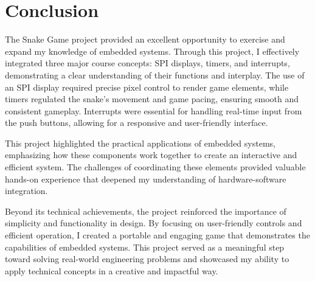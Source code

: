 \section{Conclusion}

The Snake Game project provided an excellent opportunity to exercise and expand my knowledge of embedded systems. Through this project, I effectively integrated three major course concepts: SPI displays, timers, and interrupts, demonstrating a clear understanding of their functions and interplay. The use of an SPI display required precise pixel control to render game elements, while timers regulated the snake’s movement and game pacing, ensuring smooth and consistent gameplay. Interrupts were essential for handling real-time input from the push buttons, allowing for a responsive and user-friendly interface.

This project highlighted the practical applications of embedded systems, emphasizing how these components work together to create an interactive and efficient system. The challenges of coordinating these elements provided valuable hands-on experience that deepened my understanding of hardware-software integration.

Beyond its technical achievements, the project reinforced the importance of simplicity and functionality in design. By focusing on user-friendly controls and efficient operation, I created a portable and engaging game that demonstrates the capabilities of embedded systems. This project served as a meaningful step toward solving real-world engineering problems and showcased my ability to apply technical concepts in a creative and impactful way.
 
